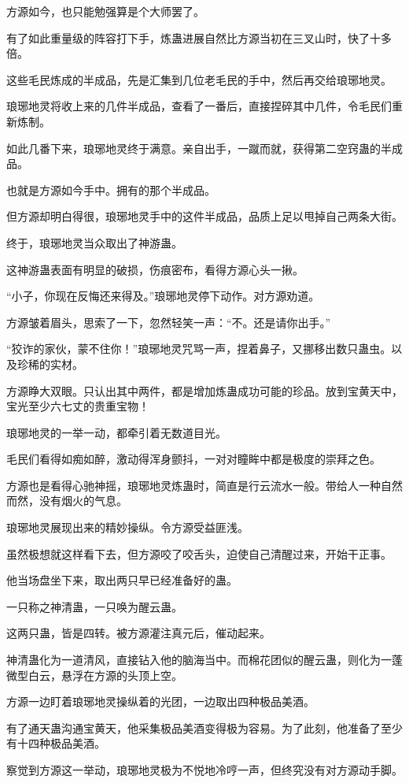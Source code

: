 \begin{this_body}
方源如今，也只能勉强算是个大师罢了。

有了如此重量级的阵容打下手，炼蛊进展自然比方源当初在三叉山时，快了十多倍。

这些毛民炼成的半成品，先是汇集到几位老毛民的手中，然后再交给琅琊地灵。

琅琊地灵将收上来的几件半成品，查看了一番后，直接捏碎其中几件，令毛民们重新炼制。

如此几番下来，琅琊地灵终于满意。亲自出手，一蹴而就，获得第二空窍蛊的半成品。

也就是方源如今手中。拥有的那个半成品。

但方源却明白得很，琅琊地灵手中的这件半成品，品质上足以甩掉自己两条大街。

终于，琅琊地灵当众取出了神游蛊。

这神游蛊表面有明显的破损，伤痕密布，看得方源心头一揪。

“小子，你现在反悔还来得及。”琅琊地灵停下动作。对方源劝道。

方源皱着眉头，思索了一下，忽然轻笑一声：“不。还是请你出手。”

“狡诈的家伙，蒙不住你！”琅琊地灵咒骂一声，捏着鼻子，又挪移出数只蛊虫。以及珍稀的实材。

方源睁大双眼。只认出其中两件，都是增加炼蛊成功可能的珍品。放到宝黄天中，宝光至少六七丈的贵重宝物！

琅琊地灵的一举一动，都牵引着无数道目光。

毛民们看得如痴如醉，激动得浑身颤抖，一对对瞳眸中都是极度的崇拜之色。

方源也是看得心驰神摇，琅琊地灵炼蛊时，简直是行云流水一般。带给人一种自然而然，没有烟火的气息。

琅琊地灵展现出来的精妙操纵。令方源受益匪浅。

虽然极想就这样看下去，但方源咬了咬舌头，迫使自己清醒过来，开始干正事。

他当场盘坐下来，取出两只早已经准备好的蛊。

一只称之神清蛊，一只唤为醒云蛊。

这两只蛊，皆是四转。被方源灌注真元后，催动起来。

神清蛊化为一道清风，直接钻入他的脑海当中。而棉花团似的醒云蛊，则化为一蓬微型白云，悬浮在方源的头顶上空。

方源一边盯着琅琊地灵操纵着的光团，一边取出四种极品美酒。

有了通天蛊沟通宝黄天，他采集极品美酒变得极为容易。为了此刻，他准备了至少有十四种极品美酒。

察觉到方源这一举动，琅琊地灵极为不悦地冷哼一声，但终究没有对方源动手脚。


\end{this_body}
